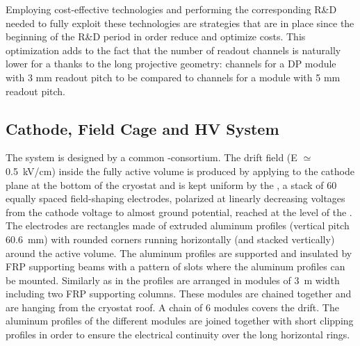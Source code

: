 
Employing cost-effective technologies and performing the corresponding R\&D needed to fully exploit these technologies are strategies that are in place since the beginning of the R\&D period in order reduce and optimize costs.   
This optimization adds to the fact that the number of readout channels is naturally lower for a  thanks to the long projective geometry: \dpnumcrpch channels for a DP module with 3 mm readout pitch to be compared to \spnumch channels for a \single module with 5 mm readout pitch. %


\subsection{Cathode, Field Cage and HV System}
\label{v4:fddp-ov:cathode}

The  system is designed by a common \single{}-\dual consortium.
The drift field (E ${\simeq}$ \SI{0.5}{kV/cm}) inside the fully active \lar volume is produced by applying  to the cathode plane at the bottom of the cryostat and is kept uniform by the , a stack of \num{60} equally spaced field-shaping electrodes,  polarized at linearly decreasing voltages from the cathode  voltage to almost ground potential, reached at the level of the . The electrodes are rectangles made of extruded aluminum profiles (vertical pitch \SI{60.6}{mm}) with rounded corners running horizontally (and stacked vertically) around the active volume. The aluminum profiles are supported and insulated by FRP supporting beams with a pattern of slots where the aluminum profiles can be mounted. Similarly as in  the profiles are arranged in modules of \SI{3}{m} width including two FRP supporting columns. These modules are chained together and  are hanging from the cryostat roof. A chain of \num{6} modules covers the \dpmaxdrift drift. The aluminum profiles of the different modules are joined together with short clipping profiles in order to ensure the electrical continuity over the
\dptpclen long horizontal rings. 

